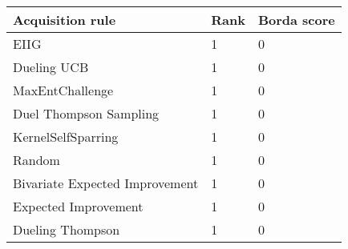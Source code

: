 \begin{tabular}{lll}
Acquisition rule & Rank & Borda score \\ 
\hline 
EIIG \citep{Benavoli2020}                          & 1 & 0 \\ 
Dueling UCB \citep{Benavoli2020}                   & 1 & 0 \\ 
MaxEntChallenge                                    & 1 & 0 \\ 
Duel Thompson Sampling \citep{Gonzalez2017}        & 1 & 0 \\ 
KernelSelfSparring \citep{Sui2017}                 & 1 & 0 \\ 
Random                                             & 1 & 0 \\ 
Bivariate Expected Improvement \citep{Nielsen2015} & 1 & 0 \\ 
Expected Improvement \citep{Brochu2010a}           & 1 & 0 \\ 
Dueling Thompson \citep{Benavoli2020}              & 1 & 0 \\ 
\hline 
\end{tabular}